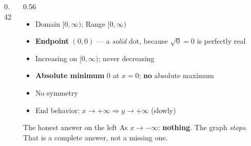 \documentclass[aspectratio=169, 11pt]{beamer}
\newcommand{\lgrid}[4]{%
  \draw[step=1, linegray!45, thin] (#1,#3) grid (#2,#4);
  \draw[->, thick, charcoal] (#1,0)--(#2,0) node[below right, font=\tiny]{$x$};
  \draw[->, thick, charcoal] (0,#3)--(0,#4) node[left, font=\tiny]{$y$};}
\begin{document}
\begin{frame}[t, plain]
  \begin{columns}[T]
    \begin{column}{0.42\textwidth}
      \centering
    \end{column}
    \begin{column}{0.56\textwidth}
      \footnotesize
      \begin{itemize}\setlength{\itemsep}{3pt}
        \item Domain $[0,\infty)$; \; Range $[0,\infty)$
        \item \textbf{Endpoint} $(0,0)$ --- a \emph{solid} dot, because $\sqrt{0}=0$ is perfectly real
        \item Increasing on $[0,\infty)$; never decreasing
        \item \textbf{Absolute minimum} $0$ at $x=0$; \textbf{no} absolute maximum
        \item No symmetry
        \item End behavior: $x\to+\infty \Rightarrow y\to+\infty$ (slowly)
      \end{itemize}
      \vspace{2pt}
      \begin{block}{The honest answer on the left}
        As $x\to-\infty$: \textbf{nothing}. The graph \emph{stops}. That is a complete answer, not a
        missing one.
      \end{block}
    \end{column}
  \end{columns}
\end{frame}
\end{document}
